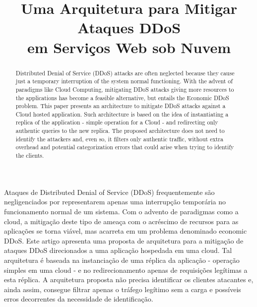 \documentclass[a4paper, 12pt]{article}
\begin{document}
\title{Uma Arquitetura para Mitigar Ataques DDoS\\ em Serviços Web sob Nuvem}


\author{
}
   
\address{
}

\maketitle


\begin{abstract}
Distributed Denial of Service (DDoS) attacks are often neglected because they cause just a temporary interruption of the system normal functioning. With the advent of paradigms like Cloud Computing, mitigating DDoS attacks giving more resources to the applications has become a feasible alternative, but entails the Economic DDoS problem. This paper presents an architecture to mitigate DDoS attacks against a Cloud hosted application. Such architecture is based on the idea of instantiating a replica of the application - simple operation for a Cloud - and redirecting only authentic queries to the new replica. The proposed architecture does not need to identify the attackers and, even so, it filters only authentic traffic, without extra overhead and potential categorization errors that could arise when trying to identify the clients.
%
\end{abstract}

\begin{resumo}
Ataques de Distributed Denial of Service (DDoS) frequentemente são negligenciados por representarem apenas uma interrupção temporária no funcionamento normal de um sistema. Com o advento de paradigmas como a cloud, a mitigação deste tipo de ameaça com o acréscimo de recursos para as aplicações se torna viável, mas acarreta em um problema denominado economic DDoS. Este artigo apresenta uma proposta de arquitetura para a mitigação de ataques DDoS direcionados a uma aplicação hospedada em uma cloud. Tal arquitetura é baseada na instanciação de uma réplica da aplicação - operação simples em uma cloud - e no redirecionamento apenas de requisições legítimas a esta réplica. A arquitetura proposta não precisa identificar os clientes atacantes e, ainda assim, consegue filtrar apenas o tráfego legítimo sem a carga e possíveis erros decorrentes da necessidade de identificação.
% 
\end{resumo}
\end{document}
